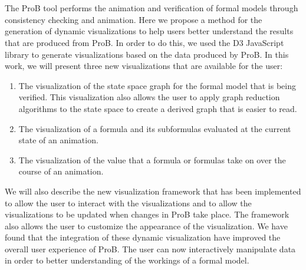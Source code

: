 \section*{}

The ProB tool performs the animation and verification of formal models  through consistency checking and animation. Here we propose a method for the generation of dynamic visualizations to help users better understand the results that are produced from ProB. In order to do this, we used the D3 JavaScript library to generate visualizations based on the data produced by ProB. In this work, we will present three new visualizations that are available for the user:

\begin{enumerate}
	\item The visualization of the state space graph for the formal model that is being verified. This visualization also allows the user to apply graph reduction algorithms to the state space to create a derived graph that is easier to read. 
	\item The visualization of a formula and its subformulas evaluated at the current state of an animation.
	\item The visualization of the value that a formula or formulas take on over the course of an animation.
\end{enumerate}

We will also describe the new visualization framework that has been implemented to allow the user to interact with the visualizations and to allow the visualizations to be updated when changes in ProB take place. The framework also allows the user to customize the appearance of the visualization. We have found that the integration of these dynamic visualization have improved the overall user experience of ProB. The user can now interactively manipulate data in order to better understanding of the workings of a formal model.